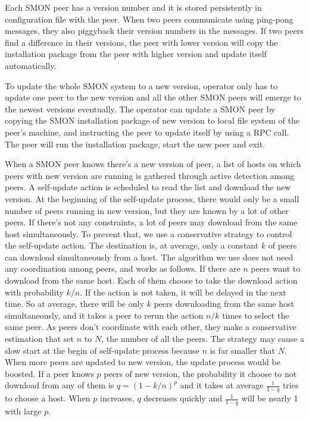 Each SMON peer has a version number and it is stored
persistently in configuration file with the peer. When two
peers communicate using ping-pong messages, they also
piggyback their version numbers in the messages. If two
peers find a difference in their versions, the peer with
lower version will copy the installation package from the
peer with higher version and update itself automatically.

To update the whole SMON system to a new version, operator
only has to update one peer to the new version and all the
other SMON peers will emerge to the newest versions
eventually. The operator can update a SMON peer by copying
the SMON installation package of new version to local file
system of the peer's machine, and instructing the peer to
update itself by using a RPC call. The peer will run the
installation package, start the new peer and exit.

When a SMON peer knows there's a new version of peer, a list of
hosts on which peers with new version are running is gathered
through active detection among peers.  A self-update action is
scheduled to read the list and download the new version. At the
beginning of the self-update process, there would only be a
small number of peers running in new version, but they are known
by a lot of other peers.  If there's not any constraints, a lot
of peers may download from the same host simultaneously. To
prevent that, we use a conservative strategy to control the
self-update action.  The destination is, at average, only a
constant $k$ of peers can download simultaneously from a host.
The algorithm we use does not need any coordination among peers,
and works as follows.  If there are $n$ peers want to download
from the same host. Each of them choose to take the download
action  with probability $k/n$. If the action is not taken, it
will be delayed in the next time. So at average, there will be
only $k$ peers downloading from the same host simultaneously,
and it takes a peer to rerun the action $n/k$ times to select
the same peer.  As peers don't coordinate with each other, they
make a conservative estimation that set $n$ to $N$, the number
of all the peers. The strategy may cause a slow start at the
begin of self-update process because $n$ is far smaller that
$N$. When more peers are updated to new version, the update
process would be boosted. If a peer knows $p$ peers of new
version, the probability it choose to not download from any of
them is $q=(1-k/n)^p$ and it takes at average $\frac{1}{1-q}$
tries to choose a host. When $p$ increases, $q$ decreases
quickly and $\frac{1}{1-q}$ will be nearly 1 with large $p$.

